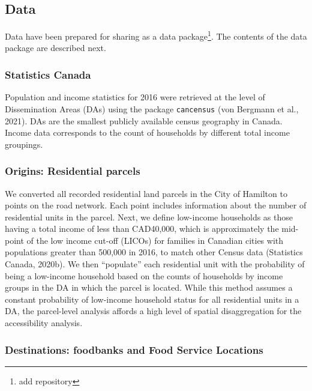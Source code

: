 \documentclass[]{elsarticle} %
\begin{document}
\hypertarget{data}{%
\subsection{Data}\label{data}}

Data have been prepared for sharing as a data package\footnote{add
  repository}. The contents of the data package are described next.

\hypertarget{statistics-canada}{%
\subsubsection{Statistics Canada}\label{statistics-canada}}

Population and income statistics for 2016 were retrieved at the level of
Dissemination Areas (DAs) using the package \texttt{cancensus} (von
Bergmann et al., 2021). DAs are the smallest publicly available census
geography in Canada. Income data corresponds to the count of households
by different total income groupings.

\hypertarget{origins-residential-parcels}{%
\subsubsection{Origins: Residential
parcels}\label{origins-residential-parcels}}

We converted all recorded residential land parcels in the City of
Hamilton to points on the road network. Each point includes information
about the number of residential units in the parcel. Next, we define
low-income households as those having a total income of less than
CAD40,000, which is approximately the mid-point of the low income
cut-off (LICOs) for families in Canadian cities with populations greater
than 500,000 in 2016, to match other Census data (Statistics Canada,
2020b). We then ``populate'' each residential unit with the probability
of being a low-income household based on the counts of households by
income groups in the DA in which the parcel is located. While this
method assumes a constant probability of low-income household status for
all residential units in a DA, the parcel-level analysis affords a high
level of spatial disaggregation for the accessibility analysis.

\hypertarget{destinations-foodbanks-and-food-service-locations}{%
\subsubsection{Destinations: foodbanks and Food Service
Locations}\label{destinations-foodbanks-and-food-service-locations}}
\end{document}
